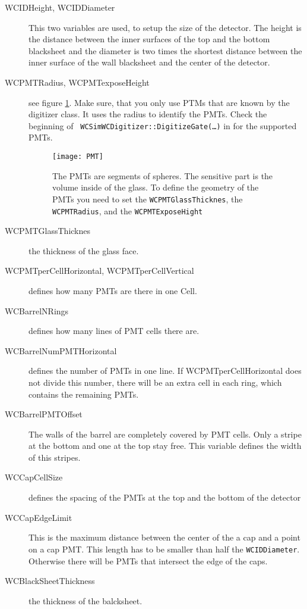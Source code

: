 \begin{description}
\item[WCIDHeight, WCIDDiameter] This two variables are used, to setup the size of the detector. The height is the distance between the inner surfaces of the top and the bottom blacksheet and the diameter is two times the shortest distance between the inner surface of the wall blacksheet and the center of the detector.

\item[WCPMTRadius, WCPMTexposeHeight] see figure \ref{fig:pmt}. Make sure, that you only use PTMs that are known by the digitizer class. It uses the radius to identify  the PMTs. Check the beginning of \texttt{ WCSimWCDigitizer::DigitizeGate(\ldots)} in  for the supported PMTs.


\begin{figure}
  \begin{center}
    \texttt{[image: PMT]}
  \end{center}
\caption{The PMTs are segments of spheres. The sensitive part is the volume inside of the glass. To define the geometry of the PMTs you need to set the \texttt{WCPMTGlassThicknes}, the \texttt{WCPMTRadius}, and the \texttt{WCPMTExposeHight}}\label{fig:pmt}
\end{figure}

\item[WCPMTGlassThicknes] the thickness of the glass face.

\item[WCPMTperCellHorizontal, WCPMTperCellVertical] defines how many PMTs are there in one Cell.

\item[WCBarrelNRings] defines how many lines of PMT cells there are. 

\item[WCBarrelNumPMTHorizontal] defines the number of PMTs in one line. If WCPMTperCellHorizontal does not divide this number, there will be an extra cell in each ring, which contains the remaining PMTs.

\item[WCBarrelPMTOffset] The walls of the barrel are completely covered by PMT cells. Only a stripe at the bottom and one at the top stay free. This variable defines the width of this stripes.

\item[WCCapCellSize] defines the spacing of the PMTs at the top and the bottom of the detector

\item[WCCapEdgeLimit] This is the maximum distance between the center of the a cap and a point on a cap PMT. This length has to be smaller than half the \texttt{WCIDDiameter}. Otherwise there will be PMTs that intersect the edge of the caps.

\item[WCBlackSheetThickness] the thickness of the balcksheet.
\end {description}

